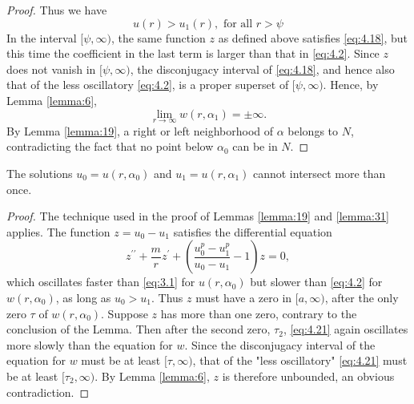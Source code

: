\begin{proof}
  Thus we have
  \begin{equation}\label{eq:4.19}
    u(r)>u_1(r), \text { for all } r>\psi    
  \end{equation}
  In the interval $[\psi, \infty)$, the same function $z$ as defined above satisfies
  \eqref{eq:4.18}, but this time the coefficient in the last term is larger than 
  that in \eqref{eq:4.2}. Since $z$ does not vanish in $[\psi, \infty)$, 
  the disconjugacy interval of \eqref{eq:4.18}, and hence also that of the less 
  oscillatory \eqref{eq:4.2}, is a proper superset of $[\psi, \infty)$.
  Hence, by Lemma \ref{lemma:6},
  \begin{equation}\label{eq:4.20}
    \lim _{r \rightarrow \infty} w\left(r, \alpha_1\right)=\pm \infty.  
  \end{equation}
  By Lemma \ref{lemma:19}, a right or left neighborhood of $\alpha$ belongs to $N$, contradicting the fact that no point below $\alpha_0$ can be in $N$.
\end{proof}

\begin{lemma}\label{lemma:32}
  The solutions $u_0=u\left(r, \alpha_0\right)$ and $u_1=u\left(r, \alpha_1\right)$ cannot 
  intersect more than once.
\end{lemma}

\begin{proof}
  The technique used in the proof of Lemmas \ref{lemma:19} and \ref{lemma:31} applies.
  The function $z=u_0-u_1$ satisfies the differential equation
  \begin{equation}\label{eq:4.21}
    z^{\prime \prime}+\frac{m}{r} z^{\prime}+\left(\frac{u_0^p-u_1^p}{u_0-u_1}-1\right) z=0,  
  \end{equation}
  which oscillates faster than \eqref{eq:3.1} for $u\left(r, \alpha_0\right)$
  but slower than \eqref{eq:4.2} for $w\left(r, \alpha_0\right)$, as long as $u_0>u_1$.
  Thus $z$ must have a zero in $[a, \infty)$, after the only zero $\tau$
  of $w\left(r, \alpha_0\right)$. Suppose $z$ has more than one zero,
  contrary to the conclusion of the Lemma. Then after the second zero,
  $\tau_2$, \eqref{eq:4.21} again oscillates more slowly than the equation for $w$.
  Since the disconjugacy interval of the equation for $w$ must be
  at least $[\tau, \infty)$, that of the "less oscillatory" \eqref{eq:4.21}
  must be at least $[\tau_2, \infty)$. By Lemma \ref{lemma:6}, $z$ is therefore unbounded,
  an obvious contradiction.
\end{proof}


